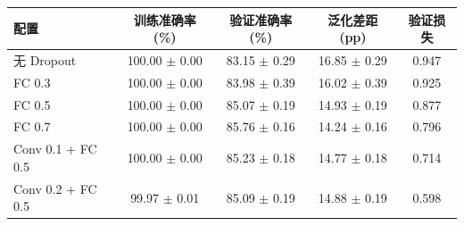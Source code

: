 \begin{tabular}{lcccc}
\toprule
配置 & 训练准确率 (\%) & 验证准确率 (\%) & 泛化差距 (pp) & 验证损失 \\
\midrule
无 Dropout & 100.00 $\pm$ 0.00 & 83.15 $\pm$ 0.29 & 16.85 $\pm$ 0.29 & 0.947 \\
FC 0.3 & 100.00 $\pm$ 0.00 & 83.98 $\pm$ 0.39 & 16.02 $\pm$ 0.39 & 0.925 \\
FC 0.5 & 100.00 $\pm$ 0.00 & 85.07 $\pm$ 0.19 & 14.93 $\pm$ 0.19 & 0.877 \\
FC 0.7 & 100.00 $\pm$ 0.00 & 85.76 $\pm$ 0.16 & 14.24 $\pm$ 0.16 & 0.796 \\
Conv 0.1 + FC 0.5 & 100.00 $\pm$ 0.00 & 85.23 $\pm$ 0.18 & 14.77 $\pm$ 0.18 & 0.714 \\
Conv 0.2 + FC 0.5 & 99.97 $\pm$ 0.01 & 85.09 $\pm$ 0.19 & 14.88 $\pm$ 0.19 & 0.598 \\
\bottomrule
\end{tabular}
